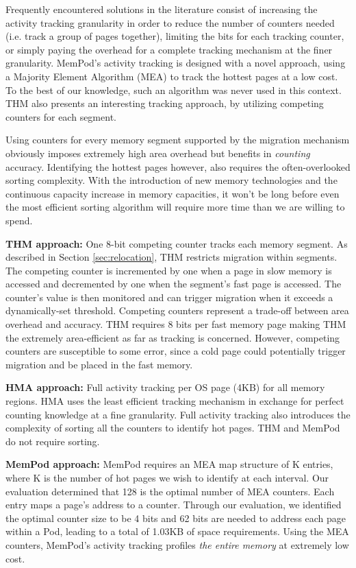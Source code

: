 Frequently encountered solutions in the literature consist of increasing the activity tracking granularity in order to reduce the number of counters needed (i.e. track a group of pages together), limiting the bits for each tracking counter, or simply paying the overhead for a complete tracking mechanism at the finer granularity. MemPod's activity tracking  is designed with a novel approach, using a Majority Element Algorithm (MEA) to track the hottest pages at a low cost. To the best of our knowledge, such an algorithm was never used in this context. THM also presents an interesting tracking approach, by utilizing competing counters for each segment.

Using counters for every memory segment supported by the migration mechanism obviously imposes extremely high area overhead but benefits in \textit{counting} accuracy. Identifying the hottest pages however, also requires the often-overlooked sorting complexity. With the introduction of new memory technologies and the continuous capacity increase in memory capacities, it won't be long before even the most efficient sorting algorithm will require more time than we are willing to spend.

	\textbf{THM approach:} One 8-bit competing counter tracks each memory segment. As described in Section \ref{sec:relocation}, THM restricts migration within segments. The competing counter is incremented by one when a page in slow memory is accessed and decremented by one when the segment's fast page is accessed. The counter's value is then monitored and can trigger migration when it exceeds a dynamically-set threshold. Competing counters represent a trade-off between area overhead and accuracy. THM requires 8 bits per fast memory page making THM the extremely area-efficient as far as tracking is concerned. However, competing counters are susceptible to some error, since a cold page could potentially trigger migration and be placed in the fast memory.

	\textbf{HMA approach:} Full activity tracking per OS page (4KB) for all memory regions. HMA uses the least efficient tracking mechanism in exchange for perfect counting knowledge at a fine granularity. Full activity tracking also introduces the complexity of sorting all the counters to identify hot pages. THM and MemPod do not require sorting.
	
	\textbf{MemPod approach:} MemPod requires an MEA map structure of K entries, where K is the number of hot pages we wish to identify at each interval. Our evaluation determined that 128 is the optimal number of MEA counters. Each entry maps a page's address to a counter. Through our evaluation, we identified the optimal counter size to be 4 bits and 62 bits are needed to address each page within a Pod, leading to a total of 1.03KB of space requirements. Using the MEA counters, MemPod's activity tracking profiles \textit{the entire memory} at extremely low cost.
	
